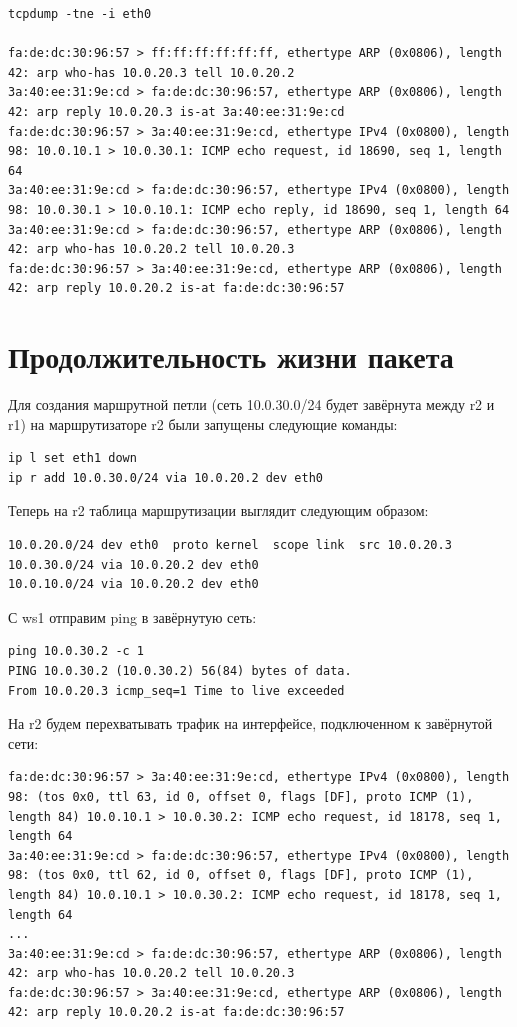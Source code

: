 \documentclass[a4paper,12pt]{article}
\begin{document}
\begin{Verbatim}
tcpdump -tne -i eth0

fa:de:dc:30:96:57 > ff:ff:ff:ff:ff:ff, ethertype ARP (0x0806), length 42: arp who-has 10.0.20.3 tell 10.0.20.2
3a:40:ee:31:9e:cd > fa:de:dc:30:96:57, ethertype ARP (0x0806), length 42: arp reply 10.0.20.3 is-at 3a:40:ee:31:9e:cd
fa:de:dc:30:96:57 > 3a:40:ee:31:9e:cd, ethertype IPv4 (0x0800), length 98: 10.0.10.1 > 10.0.30.1: ICMP echo request, id 18690, seq 1, length 64
3a:40:ee:31:9e:cd > fa:de:dc:30:96:57, ethertype IPv4 (0x0800), length 98: 10.0.30.1 > 10.0.10.1: ICMP echo reply, id 18690, seq 1, length 64
3a:40:ee:31:9e:cd > fa:de:dc:30:96:57, ethertype ARP (0x0806), length 42: arp who-has 10.0.20.2 tell 10.0.20.3
fa:de:dc:30:96:57 > 3a:40:ee:31:9e:cd, ethertype ARP (0x0806), length 42: arp reply 10.0.20.2 is-at fa:de:dc:30:96:57
\end{Verbatim}

\section{Продолжительность жизни пакета}

Для создания маршрутной петли (сеть 10.0.30.0/24 будет завёрнута между r2 и r1) на маршрутизаторе r2 были запущены следующие команды:

\begin{Verbatim}
ip l set eth1 down
ip r add 10.0.30.0/24 via 10.0.20.2 dev eth0
\end{Verbatim}

Теперь на r2 таблица маршрутизации выглядит следующим образом:

\begin{Verbatim}
10.0.20.0/24 dev eth0  proto kernel  scope link  src 10.0.20.3 
10.0.30.0/24 via 10.0.20.2 dev eth0 
10.0.10.0/24 via 10.0.20.2 dev eth0 
\end{Verbatim}

С ws1 отправим ping в завёрнутую сеть:

\begin{Verbatim}
ping 10.0.30.2 -c 1
PING 10.0.30.2 (10.0.30.2) 56(84) bytes of data.
From 10.0.20.3 icmp_seq=1 Time to live exceeded
\end{Verbatim}

На r2 будем перехватывать трафик на интерфейсе, подключенном к завёрнутой сети:

\begin{Verbatim}
fa:de:dc:30:96:57 > 3a:40:ee:31:9e:cd, ethertype IPv4 (0x0800), length 98: (tos 0x0, ttl 63, id 0, offset 0, flags [DF], proto ICMP (1), length 84) 10.0.10.1 > 10.0.30.2: ICMP echo request, id 18178, seq 1, length 64
3a:40:ee:31:9e:cd > fa:de:dc:30:96:57, ethertype IPv4 (0x0800), length 98: (tos 0x0, ttl 62, id 0, offset 0, flags [DF], proto ICMP (1), length 84) 10.0.10.1 > 10.0.30.2: ICMP echo request, id 18178, seq 1, length 64
...
3a:40:ee:31:9e:cd > fa:de:dc:30:96:57, ethertype ARP (0x0806), length 42: arp who-has 10.0.20.2 tell 10.0.20.3
fa:de:dc:30:96:57 > 3a:40:ee:31:9e:cd, ethertype ARP (0x0806), length 42: arp reply 10.0.20.2 is-at fa:de:dc:30:96:57
\end{Verbatim}
\end{document}
